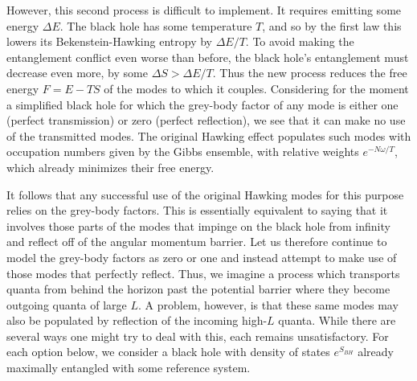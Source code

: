 \documentclass[12pt]{article}
\begin{document}
{However, this second process is difficult to implement. It requires emitting some energy $\Delta E$.  The black hole has some temperature $T$, and so by the first law this lowers its Bekenstein-Hawking entropy by $\Delta E/T$.  To avoid making the entanglement conflict even worse than before, the black hole's entanglement must decrease even more, by some $\Delta S > \Delta E/T$. Thus the new process reduces the free energy $F = E-TS$ of the modes to which it couples.  Considering for the moment a simplified black hole for which the grey-body factor of any mode is either one (perfect transmission) or zero (perfect reflection), we see that it can make no use of the transmitted modes.  The original Hawking effect populates such modes with occupation numbers given by the Gibbs ensemble, with relative weights $e^{-N\omega/T}$, which already minimizes their free energy.


It follows that any successful use of the original Hawking modes for this purpose relies on the grey-body factors.  This is essentially equivalent to saying that it involves those parts of the modes that impinge on the black hole from infinity and reflect off of the angular momentum barrier.  Let us therefore continue to model the grey-body factors as zero or one and instead attempt to make use of those modes that perfectly reflect.
Thus, we imagine a process which transports quanta from behind the horizon past the potential barrier where they become outgoing quanta of large $L$.  A problem, however,  is that these same modes may also be populated by reflection of the incoming high-$L$ quanta.  While there are several ways one might try to deal with this, each remains unsatisfactory. For each option below, we consider a black hole with density of states $e^{S_{BH}}$ already maximally entangled with some reference system.

}
\end{document}
